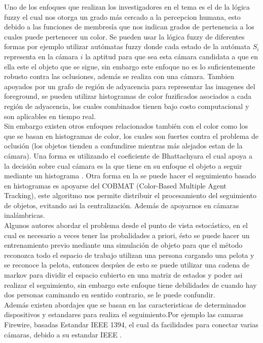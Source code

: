 Uno de los enfoques que realizan los investigadores en el tema es el de la l\'ogica fuzzy el cual nos otorga un grado m\'as cercado a la percepcion humana, esto debido a las funciones de membres\'ia que nos indican grados de pertenencia  a los cuales puede pertenecer un color. Se pueden usar la l\'ogica fuzzy de diferentes formas por ejemplo utilizar aut\'omatas fuzzy donde cada estado de la aut\'omata $S_i$ representa en la c\'amara $i$ la aptitud para que sea esta c\'amara candidata a que en ella este el objeto que se sigue\cite{morioka_mul}, sin embargo este enfoque no es lo suficientemente robusto contra las oclusiones, adem\'as se  realiza con una c\'amara. Tambien apoyados por un grafo de regi\'on de adyacencia para representar las imagenes del foreground, se pueden utilizar histogramas de color fuzificados asociados a cada regi\'on de adyacencia, los cuales combinados tienen bajo costo computacional y son aplicables en tiempo real\cite{hossiein_mul}.\\
Sin embargo existen otros enfoques relacionados tambi\'en  con el color como los que se basan en  histogramas de color, los cuales son fuertes contra el problema de oclusi\'on (los objetos tienden a confundirse mientras m\'as alejados estan de la c\'amara). Una forma es utilizando el coeficiente de Bhattachyara el cual apoya a la decisi\'on sobre cual c\'amara es la que tiene en su enfoque el objeto a seguir mediante un histograma \cite{nummiaro_mot}. Otra forma en la se puede hacer el seguimiento basado en histogramas es apoyarse del COBMAT (Color-Based Multiple Agent Tracking), este algoritmo nos permite distribuir el procesamiento del seguimiento de objetos, evitando asi la centralizaci\'on. Adem\'as de apoyarnos en c\'amaras inal\'ambricas\cite{oto_mul}.  \\
Algunos autores abordar el problema desde el punto de vista estoc\'astico,  en el cual es necesario a veces tener las probalidades a priori, \'esto se puede hacer un entrenamiento previo mediante una simulaci\'on de objeto para que el m\'etodo reconozca todo el espacio de trabajo utilizan una persona cargando una pelota y se reconoce la pelota, entonces desp\'ues de esto se puede utilizar una cadena de markov para dividir el espacio cubierto en una matriz de estados  y poder asi realizar el seguimiento\cite{Dick_mot}, sin embargo este enfoque tiene debilidades de cuando hay dos personas caminando en sentido contrario, se le puede confundir. \\
Adem\'as existen abordajes que se basan en las caracteristicas de determinados dispositivos y estandares para realiza el seguimiento.Por ejemplo las camaras Firewire, basadas Estandar IEEE 1394, el cual da facilidades para conectar varias c\'amaras, debido a su estandar IEEE \cite{kumar_mot}.\\
